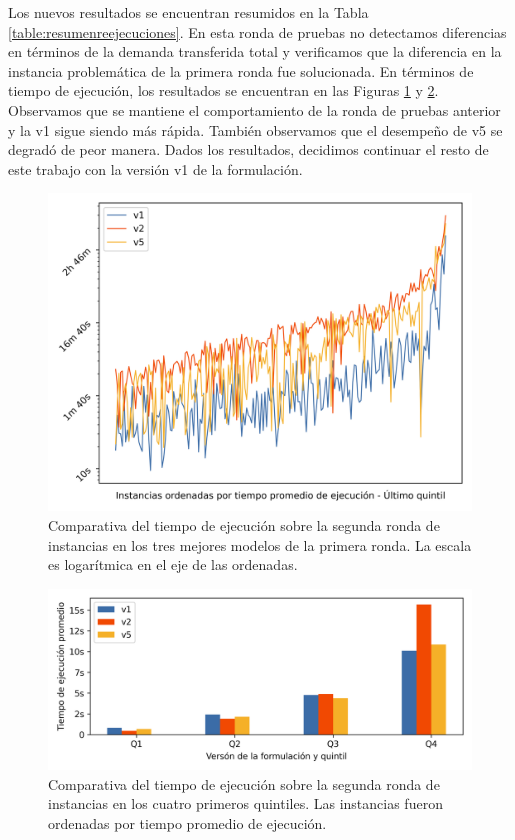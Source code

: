 Los nuevos resultados se encuentran resumidos en la Tabla \ref{table:resumenreejecuciones}. En esta ronda de pruebas no detectamos diferencias en términos de la demanda transferida total y verificamos que la diferencia en la instancia problemática de la primera ronda fue solucionada. En términos de tiempo de ejecución, los resultados se encuentran en las Figuras \ref{fig:runtimecomparisonrerun} y \ref{fig:firstfourquintilesrerun}. Observamos que se mantiene el comportamiento de la ronda de pruebas anterior y la v1 sigue siendo más rápida. También observamos que el desempeño de v5 se degradó de peor manera. Dados los resultados, decidimos continuar el resto de este trabajo con la versión v1 de la formulación.

\begin{figure}[h!]
  \centering
  \includegraphics[width=12cm]{../resources/run_time_comparison_rerun.png}
  \caption{Comparativa del tiempo de ejecución sobre la segunda ronda de instancias en los tres mejores modelos de la primera ronda. La escala es logarítmica en el eje de las ordenadas.} \label{fig:runtimecomparisonrerun}
\end{figure}

\begin{figure}[h!]
  \centering
  \includegraphics[width=12cm]{../resources/run_time_comparison_by_quintile_rerun.png}
  \caption{Comparativa del tiempo de ejecución sobre la segunda ronda de instancias en los cuatro primeros quintiles. Las instancias fueron ordenadas por tiempo promedio de ejecución.} \label{fig:firstfourquintilesrerun}
\end{figure}
